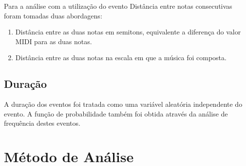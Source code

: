 Para a análise com a utilização do evento Distância entre notas consecutivas foram tomadas duas abordagens:

\begin{enumerate}
    \item Distância entre as duas notas em semitons, equivalente a diferença do valor MIDI para as duas notas.
    \item Distância entre as duas notas na escala em que a música foi composta.
\end{enumerate}

\subsection{Duração}

A duração dos eventos foi tratada como uma variável aleatória independente do evento. A função de probabilidade também foi obtida através da análise de frequência destes eventos.

\section{Método de Análise}



